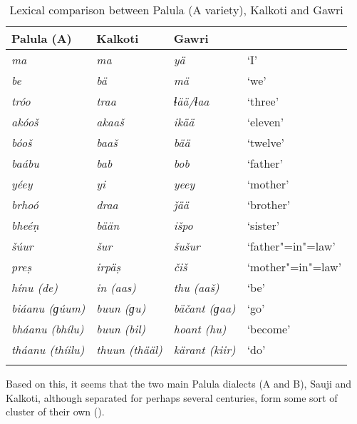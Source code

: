\begin{table}[ht]
\caption{Lexical comparison between Palula (A variety), Kalkoti and Gawri}
\begin{tabularx}{\textwidth}{ Q Q Q Q }
\lsptoprule
Palula (A) &
Kalkoti &
Gawri &
\\\midrule
\textit{ma} &
\textit{ma} &
\textit{yä} &
`I'\\
\textit{be} &
\textit{bä} &
\textit{mä} &
`we'\\
\textit{tróo} &
\textit{traa} &
\textit{ɬää/‌ɬaa} &
`three'\\
\textit{akóoš} &
\textit{akaaš} &
\textit{ikää} &
`eleven'\\
\textit{bóoš} &
\textit{baaš} &
\textit{bää} &
`twelve'\\
\textit{baábu} &
\textit{bab} &
\textit{bob} &
`father'\\
\textit{yéey} &
\textit{yi} &
\textit{yeey} &
`mother'\\
\textit{brhoó} &
\textit{draa} &
\textit{ǰää} &
`brother'\\
\textit{bheéṇ} &
\textit{bään} &
\textit{išpo} &
`sister'\\
\textit{šúur} &
\textit{šur} &
\textit{šušur} &
`father"=in"=law'\\
\textit{preṣ} &
\textit{irpäṣ} &
\textit{čiš} &
`mother"=in"=law'\\
\textit{hínu (de)} &
\textit{in (aas)} &
\textit{thu (aaš)} &
`be'\\
\textit{biáanu (ɡúum)} &
\textit{buun (ɡu)} &
\textit{bäčant (ɡaa)} &
`go'\\
\textit{bháanu (bhílu)} &
\textit{buun (bil)} &
\textit{hoant (hu)} &
`become'\\
\textit{tháanu (thíilu)} &
\textit{thuun (thääl)} &
\textit{kärant (kiir)} &
`do'\\\lspbottomrule
\end{tabularx}
\label{tab:1-3}
\end{table}

 
Based on this, it seems that the two main Palula dialects (A and B), Sauji and Kalkoti, although separated for perhaps several centuries, form some sort of cluster of their own (\citealt{liljegren2009}).


